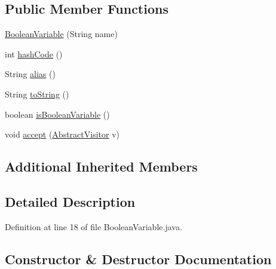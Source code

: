 \subsection*{Public Member Functions}
\begin{DoxyCompactItemize}
\item 
\hyperlink{classuran_1_1formula_1_1cnf_1_1_boolean_variable_acc41e5e4e33ccc4db8e20ae3f1b23619}{Boolean\+Variable} (String name)
\item 
int \hyperlink{classuran_1_1formula_1_1cnf_1_1_boolean_variable_aacbd3bdf07826f1a0bc5dac94b0a3903}{hash\+Code} ()
\item 
String \hyperlink{classuran_1_1formula_1_1cnf_1_1_boolean_variable_ad309b8fb1955427b3962b013c8f78cc1}{alias} ()
\item 
String \hyperlink{classuran_1_1formula_1_1cnf_1_1_boolean_variable_ae1b00401cf7296fe52772a4f8b0899e0}{to\+String} ()
\item 
boolean \hyperlink{classuran_1_1formula_1_1cnf_1_1_boolean_variable_a8827aedaffa260fa107b3b2b5c59f197}{is\+Boolean\+Variable} ()
\item 
void \hyperlink{classuran_1_1formula_1_1cnf_1_1_boolean_variable_a910e2c688a7f9ad8e7f599a2f1df4b82}{accept} (\hyperlink{classuran_1_1formula_1_1cnf_1_1visitor_1_1_abstract_visitor}{Abstract\+Visitor} v)
\end{DoxyCompactItemize}
\subsection*{Additional Inherited Members}


\subsection{Detailed Description}


Definition at line 18 of file Boolean\+Variable.\+java.



\subsection{Constructor \& Destructor Documentation}
\hypertarget{classuran_1_1formula_1_1cnf_1_1_boolean_variable_acc41e5e4e33ccc4db8e20ae3f1b23619}{}
